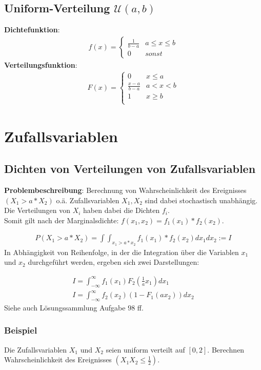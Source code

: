 \documentclass{article}
\begin{document}
\subsection{Uniform-Verteilung $\mathcal{U}(a,b)$}
\textbf{Dichtefunktion}:
\begin{align} f(x) =
	\begin{cases}
		\frac{1}{b - a} & a \leq x \leq b \\
		0               &  sonst
	\end{cases}
\end{align}
\textbf{Verteilungsfunktion}:
\begin{align} F(x) =
	\begin{cases}
		0     & x \leq a\\
		\frac{x - a}{b - a} & a < x < b \\
		1     & x \geq b\\
	\end{cases}
\end{align}

\section{Zufallsvariablen}
\subsection{Dichten von Verteilungen von Zufallsvariablen}
\textbf{Problembeschreibung}: Berechnung von Wahrscheinlichkeit des
Ereignisses $(X_1 > a * X_2)$ o.\"a.
Zufallsvariablen $X_1, X_2$  sind dabei stochastisch
unabh\"angig. Die Verteilungen von $X_i$ haben dabei die Dichten
$f_i$.\\
Somit gilt nach der Marginalsdichte: $f(x_1,x_2) = f_1(x_1)*f_2(x_2)$.

\begin{align}
	P(X_1 > a * X_2) = \int \int_{x_1>a*x_2} f_1(x_1)*f_2(x_2) dx_1dx_2 := I
\end{align}
In Abh\"angigkeit von Reihenfolge, in der die Integration \"uber die Variablen
$x_1$ und $x_2$ durchgef\"uhrt werden, ergeben sich zwei Darstellungen:

\begin{align}
	I = \int_{-\infty}^{\infty} f_1(x_1)F_2(\frac{1}{a}x_1)dx_1\\
	I = \int_{-\infty}^{\infty} f_2(x_2)(1 - F_1(ax_2))dx_2
\end{align}
Siehe auch L\"osungssammlung Aufgabe $98$ ff.

\subsubsection{Beispiel}
Die Zufallsvariablen $X_1$ und $X_2$ seien uniform verteilt auf
$[0, 2]$. Berechnen Wahrscheinlichkeit des Ereignisses $(X_1X_2 \leq \frac{1}{2})$.
\end{document}
